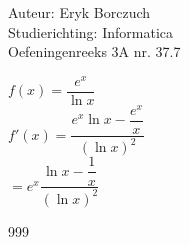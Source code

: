 \documentclass[a4paper]{article}
\begin{document}
  
\noindent \large Auteur: Eryk Borczuch \\
\noindent \large Studierichting: Informatica\\
\noindent \large Oefeningenreeks 3A nr. 37.7\\

\medskip

\normalsize

$ f(x) = \dfrac{e^x}{\ln x}$\\

$ f'(x) = \dfrac{e^x \ln x - \dfrac{e^x}{x}}{(\ln x)^2}$\\

$= e^x \dfrac{\ln x - \dfrac{1}{x}}{(\ln x )^2}$\\


\begin{thebibliography}{999}
\end{thebibliography}
\end{document}
